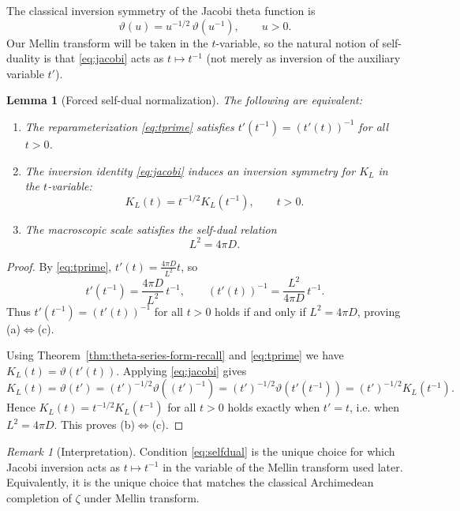 \documentclass[12pt]{amsart}
\newtheorem{lemma}[theorem]{Lemma}
\theoremstyle{definition}
\theoremstyle{remark}
\newtheorem{remark}[theorem]{Remark}
\begin{document}
The classical inversion symmetry of the Jacobi theta function is
\begin{equation}\label{eq:jacobi}
\vartheta(u)=u^{-1/2}\,\vartheta(u^{-1}),\qquad u>0.
\end{equation}
Our Mellin transform will be taken in the $t$-variable, so the natural notion of
self-duality is that \eqref{eq:jacobi} acts as $t\mapsto t^{-1}$ (not merely
as inversion of the auxiliary variable $t'$).

\begin{lemma}[Forced self-dual normalization]
\label{lem:forced-selfdual}
The following are equivalent:
\begin{enumerate}[label=(\alph*)]
\item The reparameterization \eqref{eq:tprime} satisfies $t'(t^{-1})=(t'(t))^{-1}$ for all $t>0$.
\item The inversion identity \eqref{eq:jacobi} induces an inversion symmetry for $K_L$ in the $t$-variable:
\begin{equation}\label{eq:KL-selfdual}
K_L(t)=t^{-1/2}K_L(t^{-1}),\qquad t>0.
\end{equation}
\item The macroscopic scale satisfies the self-dual relation
\begin{equation}\label{eq:selfdual}
L^2=4\pi D.
\end{equation}
\end{enumerate}
\end{lemma}

\begin{proof}
By \eqref{eq:tprime}, $t'(t)=\frac{4\pi D}{L^2}t$, so
\[
t'(t^{-1})=\frac{4\pi D}{L^2}\,t^{-1},
\qquad
(t'(t))^{-1}=\frac{L^2}{4\pi D}\,t^{-1}.
\]
Thus $t'(t^{-1})=(t'(t))^{-1}$ for all $t>0$ holds if and only if $L^2=4\pi D$,
proving (a)$\Leftrightarrow$(c).

Using Theorem~\ref{thm:theta-series-form-recall} and \eqref{eq:tprime} we have
$K_L(t)=\vartheta(t'(t))$. Applying \eqref{eq:jacobi} gives
\[
K_L(t)=\vartheta(t')=(t')^{-1/2}\vartheta((t')^{-1})
      =(t')^{-1/2}\vartheta(t'(t^{-1}))=(t')^{-1/2}K_L(t^{-1}).
\]
Hence $K_L(t)=t^{-1/2}K_L(t^{-1})$ for all $t>0$ holds exactly when $t' = t$, i.e.
when $L^2=4\pi D$. This proves (b)$\Leftrightarrow$(c).
\end{proof}

\begin{remark}[Interpretation]
\label{rem:selfdual-interpretation}
Condition \eqref{eq:selfdual} is the unique choice for which Jacobi inversion\cite{Jacobi1829} acts as
$t\mapsto t^{-1}$ in the variable of the Mellin transform used later. Equivalently,
it is the unique choice that matches the classical Archimedean completion of $\zeta$
under Mellin transform.
\end{remark}
\end{document}
